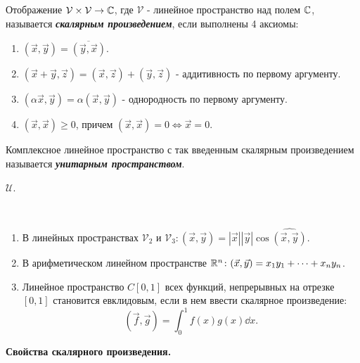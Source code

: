 \begin{definition}
    Отображение $\mathcal{V} \times \mathcal{V} \to \mathbb{C}$, где $\mathcal{V}$ - линейное пространство над полем $\mathbb{C}$, называется \textbf{\textit{скалярным произведением}}, если выполнены 4 аксиомы:
    \begin{enumerate}[nosep]
        \item $(\vec{x}, \vec{y}) = \overline{(\vec{y}, \vec{x})}$.
        \item $(\vec{x} + \vec{y}, \vec{z}) = (\vec{x}, \vec{z}) + (\vec{y}, \vec{z})$ - аддитивность по первому аргументу.
        \item $(\alpha \vec{x}, \vec{y}) = \alpha(\vec{x}, \vec{y})$ - однородность по первому аргументу.
        \item $(\vec{x}, \vec{x}) \geq 0$, причем $(\vec{x}, \vec{x}) = 0 \iff \vec{x} = 0$.
    \end{enumerate}
\end{definition}

\begin{definition}
    Комплексное линейное пространство с так введенным скалярным произведением называется \textbf{\textit{унитарным пространством}}.
\end{definition}

\begin{designation}
    $\mathcal{U}$.
\end{designation}

\begin{example}~
    \begin{enumerate}[nosep]
        \item В линейных пространствах $\mathcal{V}_2$ и $\mathcal{V}_3 \colon (\vec{x}, \vec{y}) = |\vec{x}||\vec{y}|\cos \widehat{(\vec{x}, \vec{y})}$.
        \item В арифметическом линейном пространстве $\mathbb{R}^n \colon (\vec{x}, \vec{y}) = x_1y_1 + \dots + x_ny_n$. 
        \item Линейное пространство $C[0, 1]$ всех функций, непрерывных на отрезке $[0, 1]$ становится евклидовым, если в нем ввести скалярное произведение:
        $$(\vec{f}, \vec{g}) = \int_{0}^{1} f(x)g(x) \dd x.$$
    \end{enumerate}
\end{example}

\textbf{Свойства скалярного произведения.}

